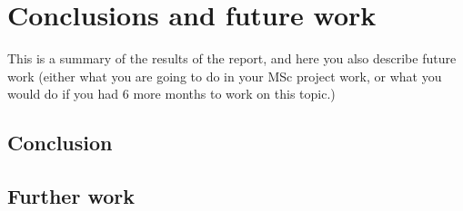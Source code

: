 \chapter{Conclusions and future work}\label{cha:conclusions}
%
This is a summary of the results of the report, and here you also describe future work (either what you are going to do in your MSc project work, or what you would do if you had 6 more months to work on this topic.)












\section{Conclusion}


\section{Further work}